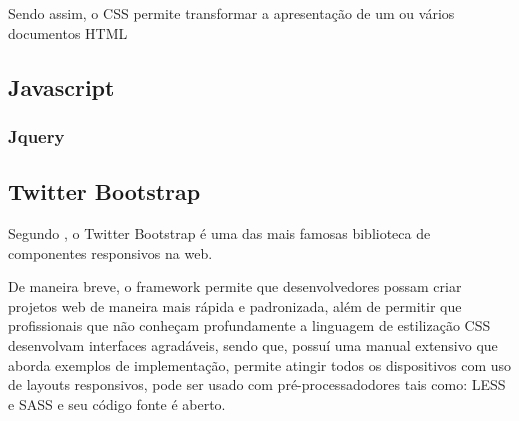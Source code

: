 Sendo assim, o \acs{CSS} permite transformar a apresentação de um ou vários
documentos \acs{HTML}

\subsection{Javascript}
\subsubsection{Jquery}
\subsection{Twitter Bootstrap}

Segundo \cite{jumpStartResponsiveWebDesign}, o \acs{Twitter Bootstrap}  é uma
das mais famosas biblioteca de componentes responsivos na web.

De maneira breve, o framework permite que desenvolvedores possam criar
projetos web de maneira mais rápida e padronizada, além de permitir que
profissionais que não conheçam profundamente a linguagem de estilização 
\acs{CSS} desenvolvam interfaces agradáveis, sendo que, possuí uma manual 
extensivo que aborda exemplos de implementação, permite atingir todos os 
dispositivos com uso de layouts responsivos, pode ser usado com
pré-processadodores  tais como: \acs{LESS} e \acs{SASS} e seu código fonte é
aberto.

